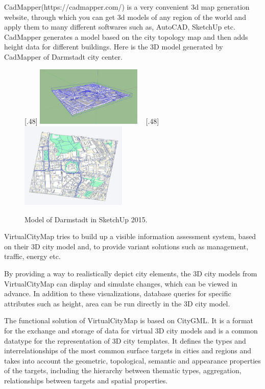 CadMapper(https://cadmapper.com/) is a very convenient 3d map generation website, through which you can get 3d models of any region of the world and apply them to many different softwares such as, AutoCAD, SketchUp etc. CadMapper generates a model based on the city topology map and then adds height data for different buildings. Here is the 3D model generated by CadMapper of Darmstadt city center.

\begin{figure}[htb]
	\centering	
	[.48\linewidth]{
		\includegraphics[width=0.45\textwidth]{gfx/Darmstadt} 	
	}  	
	~
	[.48\linewidth]{
		\includegraphics[width=0.45\textwidth]{gfx/Darmstadt_2}  	
	}	  
	
	\caption{Model of Darmstadt in SketchUp 2015.}
	\label{fig:ex_3}
\end{figure}

VirtualCityMap tries to build up a visible information assessment system, based on their 3D city model and, to provide variant solutions such as management, traffic, energy etc.


By providing a way to realistically depict city elements, the 3D city models from VirtualCityMap can display and simulate changes, which can be viewed in advance. In addition to these visualizations, database queries for specific attributes such as height, area can be run directly in the 3D city model.

The functional solution of VirtualCityMap is based on CityGML. It is a format for the exchange and storage of data for virtual 3D city models and is a common datatype for the representation of 3D city templates. It defines the types and interrelationships of the most common surface targets in cities and regions and takes into account the geometric, topological, semantic and appearance properties of the targets, including the hierarchy between thematic types, aggregation, relationships between targets and spatial properties.

